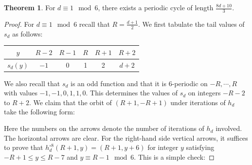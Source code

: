 \documentclass[12pt]{amsart}
\theoremstyle{definition}
\newtheorem{theorem}{Theorem}[section]
\begin{document}
\begin{theorem}\label{thm:thmBinsection}
    For $d\equiv 1\mod 6$, there exists a periodic cycle of length $\frac{8d+10}{3}$.
\end{theorem}
\begin{proof}
    For $d\equiv 1\mod 6$ recall that $R = \frac{d+1}{2}$. We first tabulate the tail values of $s_d$ as follows:
    \begin{center}
        \begin{tabular}{c||c|c|c|c|c}
            $y$ & $R-2$ & $R-1$ & $R$ & $R+1$ & $R+2$ \\ \hline
            $s_d(y)$ & $-1$ & 0 & 1 & 2 & $d+2$
        \end{tabular}
    \end{center}
    We also recall that $s_d$ is an odd function and that it is 6-periodic on $-R,\cdots,R$ with values $-1,-1,0,1,1,0$. This determines the values of $s_d$ on integers $-R-2$ to $R+2$. We claim that the orbit of $(R+1,-R+1)$ under iterations of $h_d$ take the following form:
    \begin{center}
    \end{center}
    Here the numbers on the arrows denote the number of iterations of $h_d$ involved. The horizontal arrows are clear. For the right-hand side vertical arrows, it suffices to prove that $h_d^{\circ 8}(R+1,y) = (R+1,y+6)$ for integer $y$ satisfying $-R+1\leq y\leq R-7$ and $y\equiv R-1\mod 6$. This is a simple check:

\end{proof}
\end{document}
